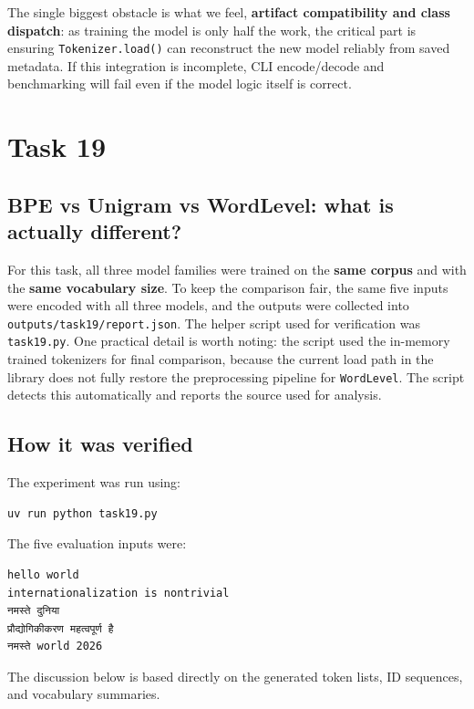 \documentclass{article}
\begin{document}
The single biggest obstacle is what we feel, \textbf{artifact compatibility and class dispatch}:  
as training the model is only half the work, the critical part is ensuring
\texttt{Tokenizer.load()} can reconstruct the new model reliably from saved metadata.
If this integration is incomplete, CLI encode/decode and benchmarking will fail even if the model logic itself is correct.


\newpage
\section{Task 19}

\subsection{BPE vs Unigram vs WordLevel: what is actually different?}

For this task, all three model families were trained on the \textbf{same corpus} and with the \textbf{same vocabulary size}. To keep the comparison fair, the same five inputs were encoded with all three models, and the outputs were collected into \texttt{outputs/task19/report.json}. The helper script used for verification was \texttt{task19.py}. One practical detail is worth noting: the script used the in-memory trained tokenizers for final comparison, because the current load path in the library does not fully restore the preprocessing pipeline for \texttt{WordLevel}. The script detects this automatically and reports the source used for analysis.

\subsection{How it was verified}

The experiment was run using:

\begin{verbatim}
uv run python task19.py
\end{verbatim}

The five evaluation inputs were:

\begin{verbatim}
hello world
internationalization is nontrivial
नमस्ते दुनिया
प्रौद्योगिकीकरण महत्वपूर्ण है
नमस्ते world 2026
\end{verbatim}

The discussion below is based directly on the generated token lists, ID sequences, and vocabulary summaries.
\end{document}
